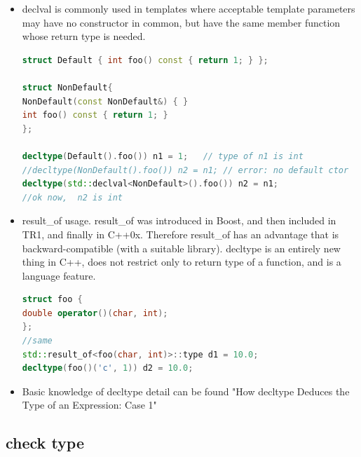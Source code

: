 \documentclass[a4paper,11pt,twoside]{book}
\newcommand{\Hilight}[1]{\makebox[0pt][l]{\color{yellow}\rule[-3pt]{#1em}{11pt}}}
\newcommand{\Hilight}[1]{}
\begin{document}
\begin{itemize}
\begin{lstlisting}[frame=single, language=c++, mathescape=true]
template <typename C>
decltype(std::declval<const C>().begin())
foo(const C& c){
	return one iterator of c
}
$\Hilight{30}$//Here no any variable in below expression.
\end{lstlisting}
	
	\item declval is commonly used in templates where acceptable template parameters may have no constructor in common, but have the same member function whose return type is needed.
	
\begin{lstlisting}[frame=single, language=c++]
struct Default { int foo() const { return 1; } };

struct NonDefault{
NonDefault(const NonDefault&) { }
int foo() const { return 1; }
};
	
decltype(Default().foo()) n1 = 1;   // type of n1 is int
//decltype(NonDefault().foo()) n2 = n1; // error: no default ctor
decltype(std::declval<NonDefault>().foo()) n2 = n1;
//ok now,  n2 is int
\end{lstlisting}
	
	\item result\_of usage. result\_of was introduced in Boost, and then included in TR1, and finally in C++0x. Therefore result\_of has an advantage that is backward-compatible (with a suitable library). decltype is an entirely new thing in C++, does not restrict only to return type of a function, and is a language feature.
\begin{lstlisting}[frame=single, language=c++]
struct foo {
double operator()(char, int);
};
//same
std::result_of<foo(char, int)>::type d1 = 10.0;
decltype(foo()('c', 1)) d2 = 10.0;
\end{lstlisting}

\item Basic knowledge of decltype detail can be found "How decltype Deduces the Type of an Expression: Case 1"
\end{itemize}

\subsection{check type}
\end{document}

